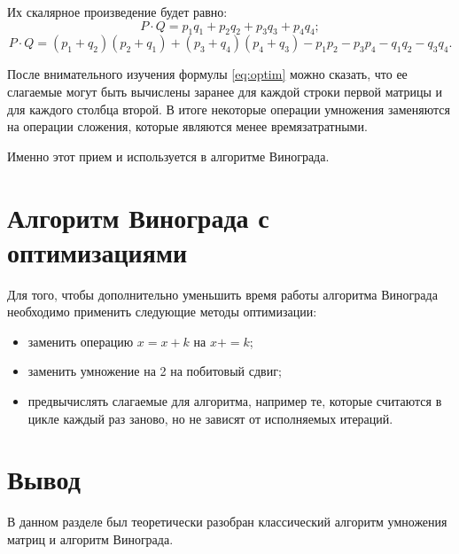 Их скалярное произведение будет равно:
\begin{equation}
\label{eq:optim}
P \cdot Q = p_{1}q_{1} + p_{2}q_{2} + p_{3}q_{3} + p_{4}q_{4};
\end{equation}
\begin{equation}
P \cdot Q = (p_{1} + q_{2})(p_{2} + q_{1}) + (p_{3} + q_{4})(p_{4} + q_{3}) - p_{1}p_{2} - p_{3}p_{4} - q_{1}q_{2} - q_{3}q_{4}.
\end{equation}

После внимательного изучения формулы \ref{eq:optim} можно сказать, что ее слагаемые могут быть вычислены заранее для каждой строки первой матрицы и для каждого столбца второй. В итоге некоторые операции умножения заменяются на операции сложения, которые являются менее времязатратными.

Именно этот прием и используется в алгоритме Винограда.

\section{Алгоритм Винограда с оптимизациями}
Для того, чтобы дополнительно уменьшить время работы алгоритма Винограда необходимо применить следующие методы оптимизации:
\begin{itemize}
    \item заменить операцию $x = x + k$ на $x += k$;
    \item заменить умножение на 2 на побитовый сдвиг;
    \item предвычислять слагаемые для алгоритма, например те, которые считаются в цикле каждый раз заново, но не зависят от исполняемых итераций.
\end{itemize}


\section*{Вывод}
В данном разделе был теоретически разобран классический алгоритм умножения матриц и алгоритм Винограда.
